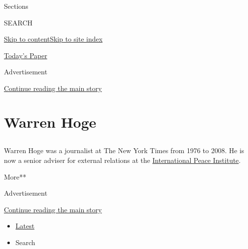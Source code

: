Sections

SEARCH

\protect\hyperlink{site-content}{Skip to
content}\protect\hyperlink{site-index}{Skip to site index}

\href{https://myaccount.nytimes.com/auth/login?response_type=cookie\&client_id=vi}{}

\href{https://www.nytimes.com/section/todayspaper}{Today's Paper}

Advertisement

\protect\hyperlink{after-top}{Continue reading the main story}

\hypertarget{warren-hoge}{%
\section{Warren Hoge}\label{warren-hoge}}

\subsection{}

Warren Hoge was a journalist at The New York Times from 1976 to 2008. He
is now a senior adviser for external relations at the
\href{https://www.ipinst.org/}{International Peace Institute}.~

More**

Advertisement

\protect\hyperlink{after-mid1}{Continue reading the main story}

\begin{itemize}
\tightlist
\item
  \protect\hyperlink{stream-panel}{Latest}
\item
  Search
\end{itemize}

